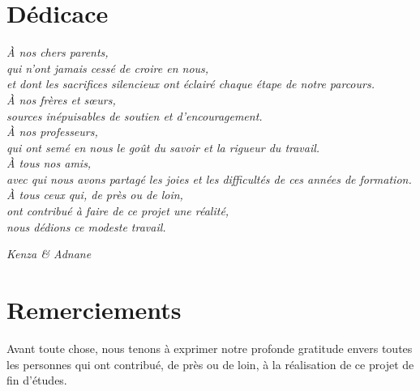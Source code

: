 \documentclass[12pt,a4paper]{report}
\begin{document}

\chapter*{Dédicace}
\thispagestyle{plain}

\begin{flushright}\itshape
\vspace{2cm}
À nos chers parents,\\
qui n'ont jamais cessé de croire en nous,\\
et dont les sacrifices silencieux ont éclairé chaque étape de notre parcours.\\[1.2cm]

À nos frères et sœurs,\\
sources inépuisables de soutien et d'encouragement.\\[1.2cm]

À nos professeurs,\\
qui ont semé en nous le goût du savoir et la rigueur du travail.\\[1.2cm]

À tous nos amis,\\
avec qui nous avons partagé les joies et les difficultés de ces années de formation.\\[1.2cm]

À tous ceux qui, de près ou de loin,\\
ont contribué à faire de ce projet une réalité,\\
nous dédions ce modeste travail.
\end{flushright}

\vspace{2cm}
\begin{flushright}
\textit{Kenza \& Adnane}
\end{flushright}

\chapter*{Remerciements}
\thispagestyle{plain}

Avant toute chose, nous tenons à exprimer notre profonde gratitude envers toutes les personnes qui ont contribué, de près ou de loin, à la réalisation de ce projet de fin d'études.
\end{document}
